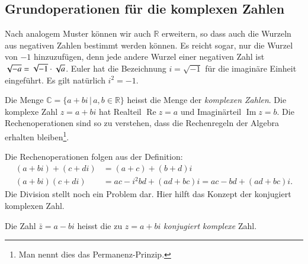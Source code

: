 \subsection{Grundoperationen für die komplexen Zahlen}
Nach analogem Muster können wir auch $\mathbb R$ erweitern, so dass auch
die Wurzeln aus negativen Zahlen bestimmt werden können. Es reicht
sogar, nur die Wurzel von $-1$ hinzuzufügen, denn jede andere Wurzel
einer negativen Zahl ist $\sqrt{-a}=\sqrt{-1}\cdot\sqrt{\mathstrut a}$.
Euler hat die Bezeichnung $i=\sqrt{-1}$ für die imaginäre Einheit eingeführt.
Es gilt natürlich $i^2=-1$.

\begin{definition}
Die Menge $\mathbb C=\{a+bi\,|\,a,b\in\mathbb R\}$ heisst die Menge der
%
%
{\em komplexen Zahlen}. Die komplexe Zahl $z=a+bi$ hat
Realteil $\operatorname{Re}z=a$ und Imaginärteil $\operatorname{Im}z=b$.
%
%
%
%
Die Rechenoperationen sind so zu verstehen, dass die Rechenregeln
der Algebra erhalten bleiben\footnote{Man nennt dies das Permanenz-Prinzip.}.
\end{definition}

Die Rechenoperationen folgen aus der Definition:
\begin{align*}
(a+bi)+(c+di)&=(a+c)+(b+d)i\\
(a+bi)(c+di)&=ac-i^2bd+(ad+bc)i=ac-bd+(ad+bc)i.
\end{align*}
Die Division stellt noch ein Problem dar. Hier hilft das Konzept der
konjugiert komplexen Zahl.
%

\begin{definition}
Die Zahl $\bar z=a-bi$ heisst die zu $z=a+bi$ {\em konjugiert komplexe} Zahl.
\end{definition}

